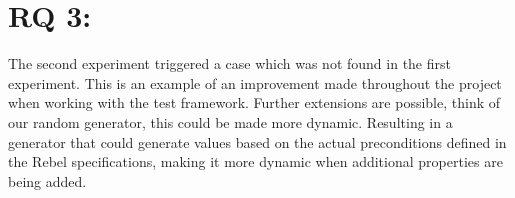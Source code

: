 \section{RQ 3: \rqThree}
The second experiment triggered a case which was not found in the first experiment. This is an example of an improvement made throughout the project when working with the test framework. Further extensions are possible, think of our random generator, this could be made more dynamic. Resulting in a generator that could generate values based on the actual preconditions defined in the Rebel specifications, making it more dynamic when additional properties are being added.



